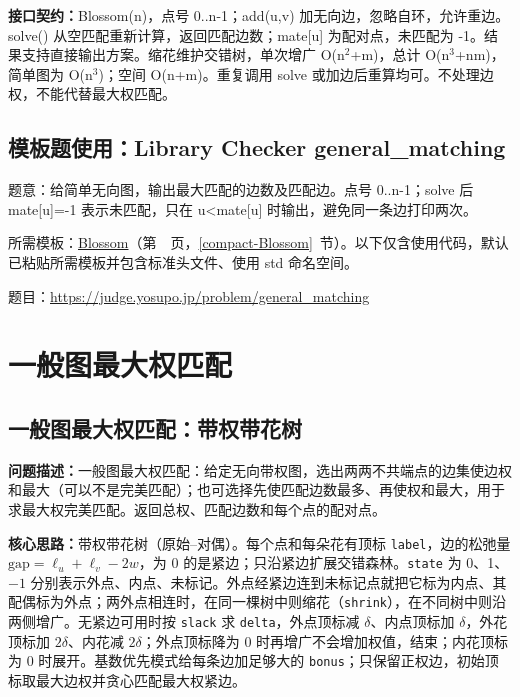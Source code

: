 {\sloppy{}\noindent\textbf{接口契约：}Blossom(n)，点号 0..n-1；add(u,v) 加无向边，忽略自环，允许重边。solve() 从空匹配重新计算，返回匹配边数；mate[u] 为配对点，未匹配为 -1。结果支持直接输出方案。缩花维护交错树，单次增广 O(n$^{2}$+m)，总计 O(n$^{3}$+nm)，简单图为 O(n$^{3}$)；空间 O(n+m)。重复调用 solve 或加边后重算均可。不处理边权，不能代替最大权匹配。\par}



\Needspace{355pt}

\subsection*{模板题使用：Library Checker general\_matching}

\label{usage-example-72}

题意：给简单无向图，输出最大匹配的边数及匹配边。点号 0..n-1；solve 后 mate[u]=-1 表示未匹配，只在 u<mate[u] 时输出，避免同一条边打印两次。

所需模板：\hyperref[compact-Blossom]{Blossom}（第~\pageref{compact-Blossom}~页，\ref{compact-Blossom}~节）。以下仅含使用代码，默认已粘贴所需模板并包含标准头文件、使用 std 命名空间。

题目：\url{https://judge.yosupo.jp/problem/general_matching}



\newpage

\section{一般图最大权匹配}

\subsection{一般图最大权匹配：带权带花树}\label{compact-WeightedBlossom}

\noindent\textbf{问题描述：}\allowbreak 一般图最大权匹配：给定无向带权图，选出两两不共端点的边集使边权和最大（可以不是完美匹配）；也可选择先使匹配边数最多、再使权和最大，用于求最大权完美匹配。返回总权、匹配边数和每个点的配对点。

\textbf{核心思路：}\allowbreak 带权带花树（原始–对偶）。每个点和每朵花有顶标 \texttt{label}，边的松弛量 $\mathrm{gap}=\ell_u+\ell_v-2w$，为 0 的是紧边；只沿紧边扩展交错森林。\texttt{state} 为 0、1、$-1$ 分别表示外点、内点、未标记。外点经紧边连到未标记点就把它标为内点、其配偶标为外点；两外点相连时，在同一棵树中则缩花（\texttt{shrink}），在不同树中则沿两侧增广。无紧边可用时按 \texttt{slack} 求 \texttt{delta}，外点顶标减 $\delta$、内点顶标加 $\delta$，外花顶标加 $2\delta$、内花减 $2\delta$；外点顶标降为 0 时再增广不会增加权值，结束；内花顶标为 0 时展开。基数优先模式给每条边加足够大的 \texttt{bonus}；只保留正权边，初始顶标取最大边权并贪心匹配最大权紧边。

